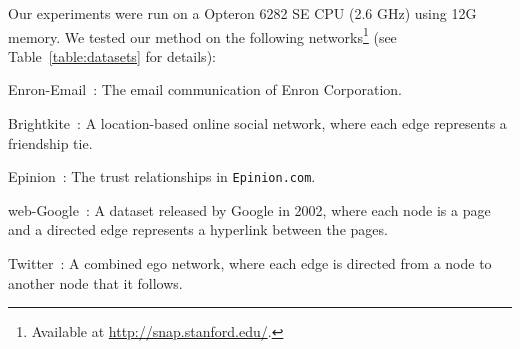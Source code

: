 Our experiments were run on a Opteron 6282 SE CPU (2.6 GHz) using 12G memory. We tested our method on the following networks\footnote{Available at \url{http://snap.stanford.edu/}.} (see Table~\ref{table:datasets} for details): 
\begin{itemize*}
 \item Enron-Email~\cite{klimt2004introducing}: The email communication of Enron Corporation.
 \item Brightkite~\cite{ChoML11}: A location-based online social network, where each edge represents a friendship tie.
 \item Epinion~\cite{richardson2003trust}: The trust relationships in \texttt{Epinion.com}.
 \item web-Google~\cite{webgoogle}: A dataset released by Google in 2002, where each node is a page and a directed edge represents a hyperlink between the pages.
 \item Twitter~\cite{McAuleyL12}: A combined ego network, where each edge is directed from a node to another node that it follows. 
\end{itemize*}


